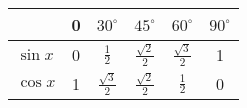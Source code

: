



	
 \label{sincoseksakt}
\begin{center}
	\renewcommand{\arraystretch}{1.5}	
	\begin{tabular}{l|c|c|c|c|c}
		& 0&$30^\circ$ & $45^\circ$ &$60^\circ$ & $90^\circ$    \\
		\hline
		$\sin x$ & 0 &$\frac{1}{2}$ & $\frac{\sqrt{2}}{2}$ & $\frac{\sqrt{3}}{2}$ & 1 \\
		$\cos x$ & 1 & $\frac{\sqrt{3}}{2}$ & $\frac{\sqrt{2}}{2}$ & $\frac{1}{2}$ & 0 \\
	\end{tabular}
\end{center}
